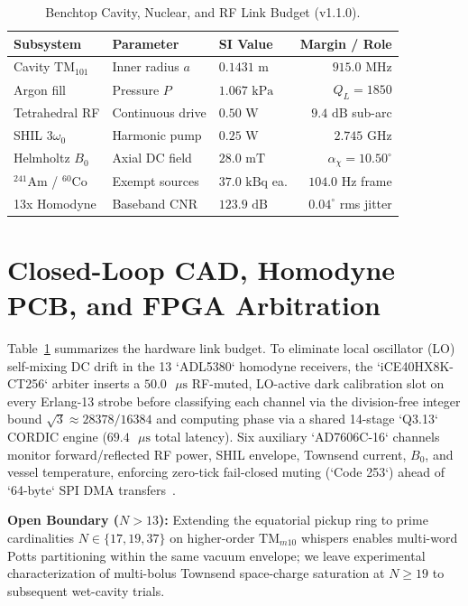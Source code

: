 \documentclass[aps,pra,twocolumn,superscriptaddress,nofootinbib,10pt]{revtex4-2}
\begin{document}
\begin{table}[b]
\caption{Benchtop Cavity, Nuclear, and RF Link Budget (v1.1.0).}
\label{tab:budget}
\begin{ruledtabular}
\begin{tabular}{lllr}
Subsystem & Parameter & SI Value & Margin / Role \\
\hline
Cavity $\text{TM}_{101}$ & Inner radius $a$ & $0.1431\text{ m}$ & $915.0\text{ MHz}$ \\
Argon fill & Pressure $P$ & $1.067\text{ kPa}$ & $Q_L = 1850$ \\
Tetrahedral RF & Continuous drive & $0.50\text{ W}$ & $9.4\text{ dB}$ sub-arc \\
SHIL $3\omega_0$ & Harmonic pump & $0.25\text{ W}$ & $2.745\text{ GHz}$ \\
Helmholtz $B_0$ & Axial DC field & $28.0\text{ mT}$ & $\alpha_\chi = 10.50^\circ$ \\
$^{241}\text{Am}$ / $^{60}\text{Co}$ & Exempt sources & $37.0\text{ kBq}$ ea. & $104.0\text{ Hz}$ frame \\
13x Homodyne & Baseband CNR & $123.9\text{ dB}$ & $0.04^\circ$ rms jitter \\
\end{tabular}
\end{ruledtabular}
\end{table}

\section{Closed-Loop CAD, Homodyne PCB, and FPGA Arbitration}

Table~\ref{tab:budget} summarizes the hardware link budget. To eliminate local
oscillator (LO) self-mixing DC drift in the 13 `ADL5380` homodyne receivers, the
`iCE40HX8K-CT256` arbiter inserts a $50.0\text{ }\mu\text{s}$ RF-muted,
LO-active dark calibration slot on every Erlang-13 strobe before classifying
each channel via the division-free integer bound $\sqrt{3} \approx 28378/16384$
and computing phase via a shared 14-stage `Q3.13` CORDIC engine ($69.4\text{ }\mu\text{s}$
total latency). Six auxiliary `AD7606C-16` channels monitor forward/reflected
RF power, SHIL envelope, Townsend current, $B_0$, and vessel temperature,
enforcing zero-tick fail-closed muting (`Code 253`) ahead of `64-byte` SPI DMA
transfers~\cite{GrimmKembali2026,GrimmWaveguide2026}.

\textbf{Open Boundary ($N > 13$):} Extending the equatorial pickup ring to prime
cardinalities $N \in \{17, 19, 37\}$ on higher-order $\text{TM}_{m10}$ whispers
enables multi-word Potts partitioning within the same vacuum envelope; we
leave experimental characterization of multi-bolus Townsend space-charge
saturation at $N \ge 19$ to subsequent wet-cavity trials.
\end{document}

